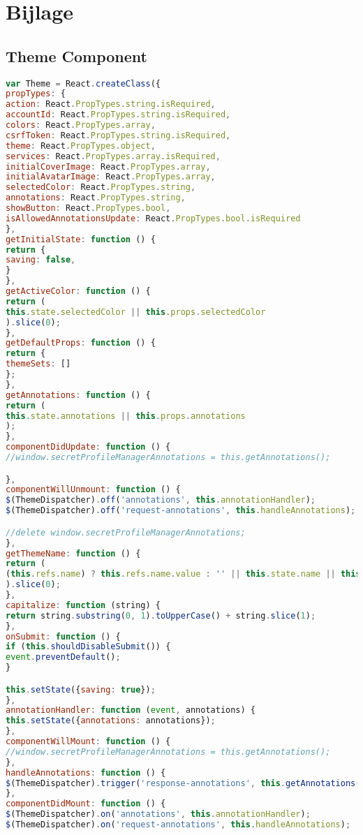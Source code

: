 
\appendix
\chapter{Bijlage}
\iffalse
\section{Theme Component}
\begin{lstlisting}[language=javascript]
var Theme = React.createClass({
propTypes: {
action: React.PropTypes.string.isRequired,
accountId: React.PropTypes.string.isRequired,
colors: React.PropTypes.array,
csrfToken: React.PropTypes.string.isRequired,
theme: React.PropTypes.object,
services: React.PropTypes.array.isRequired,
initialCoverImage: React.PropTypes.array,
initialAvatarImage: React.PropTypes.array,
selectedColor: React.PropTypes.string,
annotations: React.PropTypes.string,
showButton: React.PropTypes.bool,
isAllowedAnnotationsUpdate: React.PropTypes.bool.isRequired
},
getInitialState: function () {
return {
saving: false,
}
},
getActiveColor: function () {
return (
this.state.selectedColor || this.props.selectedColor
).slice(0);
},
getDefaultProps: function () {
return {
themeSets: []
};
},
getAnnotations: function () {
return (
this.state.annotations || this.props.annotations
);
},
componentDidUpdate: function () {
//window.secretProfileManagerAnnotations = this.getAnnotations();

},
componentWillUnmount: function () {
$(ThemeDispatcher).off('annotations', this.annotationHandler);
$(ThemeDispatcher).off('request-annotations', this.handleAnnotations);

//delete window.secretProfileManagerAnnotations;
},
getThemeName: function () {
return (
(this.refs.name) ? this.refs.name.value : '' || this.state.name || this.props.theme.name
).slice(0);
},
capitalize: function (string) {
return string.substring(0, 1).toUpperCase() + string.slice(1);
},
onSubmit: function () {
if (this.shouldDisableSubmit()) {
event.preventDefault();
}

this.setState({saving: true});
},
annotationHandler: function (event, annotations) {
this.setState({annotations: annotations});
},
componentWillMount: function () {
//window.secretProfileManagerAnnotations = this.getAnnotations();
},
handleAnnotations: function () {
$(ThemeDispatcher).trigger('response-annotations', this.getAnnotations());
},
componentDidMount: function () {
$(ThemeDispatcher).on('annotations', this.annotationHandler);
$(ThemeDispatcher).on('request-annotations', this.handleAnnotations);


\end{lstlisting}
